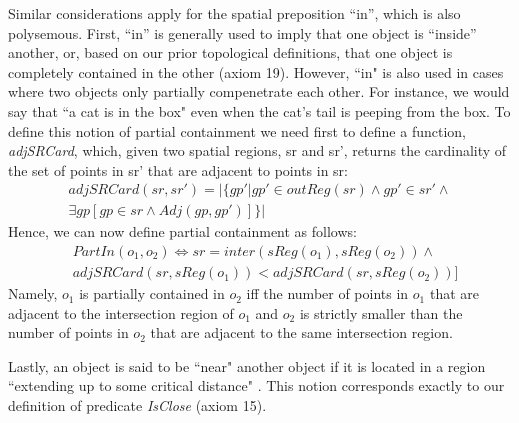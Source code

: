 \documentclass{article}
\begin{document}
Similar considerations apply for the spatial preposition ``in'', which is also polysemous. First, ``in'' is generally used to imply that one object is ``inside'' another, or, based on our prior topological definitions, that one object is completely contained in the other (axiom 19).
However, ``in" is also used in cases where two objects only partially compenetrate each other. For instance, we would say that ``a cat is in the box" even when the cat's tail is peeping from the box. To define this notion of partial containment we need first to define a function, \textit{adjSRCard}, which, given two spatial regions, sr and sr’, returns the cardinality of the set of points in sr’ that are adjacent to points in sr:
\begin{multline}
\textit{adjSRCard}(sr, sr') =  | \{gp' | gp' \in 
    \textit{outReg}(sr) \wedge gp' \in sr' \wedge \\ \exists gp[gp \in sr \wedge \textit{Adj}(gp,gp')] \} | 
\end{multline}
Hence, we can now define partial containment as follows:
\begin{align}
    & \textit{PartIn}(o_1,o_2) \Leftrightarrow   \textit{sr}=\textit{inter}(\textit{sReg}(o_1), \textit{sReg}(o_2)) \wedge \nonumber \\ & \textit{adjSRCard}(sr, \textit{sReg}(o_1)) <  \textit{adjSRCard}(sr, \textit{sReg}(o_2))] 
\end{align}
Namely, $o_1$ is partially contained in $o_2$ iff the number of points in $o_1$ that are adjacent to the intersection region of $o_1$ and $o_2$ is strictly smaller than the number of points in $o_2$ that are adjacent to the same intersection region. 

Lastly, an object is said to be ``near" another object if it is located in a region ``extending up to some critical distance" \cite{landau_what_1993}. This notion corresponds exactly to our definition of predicate \textit{IsClose} (axiom 15). 
\end{document}
